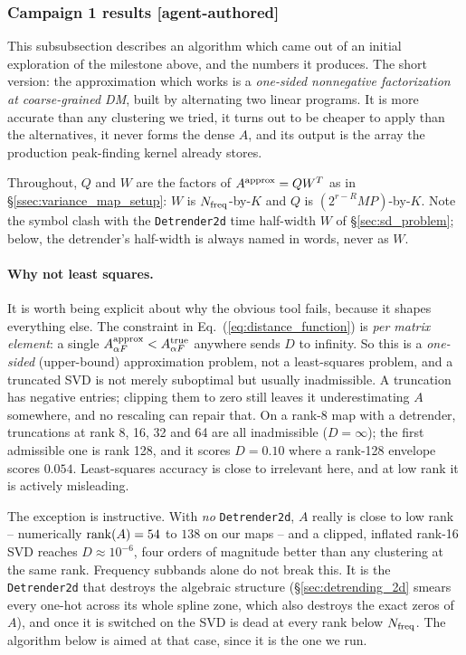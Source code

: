 \documentclass{article}
\numberwithin{equation}{section}   %
\begin{document}
\subsubsection{Campaign 1 results [agent-authored]}
\label{sssec:varmap_proposed}

This subsubsection describes an algorithm which came out of an initial exploration of the
milestone above, and the numbers it produces. The short version: the approximation which works is
a {\em one-sided nonnegative factorization at coarse-grained DM}, built by alternating two
linear programs. It is more accurate than any clustering we tried, it turns out to be cheaper to
apply than the alternatives, it never forms the dense $A$, and its output is the array the
production peak-finding kernel already stores.

Throughout, $Q$ and $W$ are the factors of $A^{\rm approx} = QW^T$ as in
\S\ref{ssec:variance_map_setup}: $W$ is $N_{\rm freq}$-by-$K$ and $Q$ is $(2^{r-R}MP)$-by-$K$.
Note the symbol clash with the {\tt Detrender2d} time half-width $W$ of \S\ref{sec:sd_problem};
below, the detrender's half-width is always named in words, never as $W$.

\paragraph*{Why not least squares.}
It is worth being explicit about why the obvious tool fails, because it shapes everything else.
The constraint in Eq.\ (\ref{eq:distance_function}) is {\em per matrix element}: a single
$A^{\rm approx}_{\alpha F} < A^{\rm true}_{\alpha F}$ anywhere sends $D$ to infinity. So this is
a {\em one-sided} (upper-bound) approximation problem, not a least-squares problem, and a
truncated SVD is not merely suboptimal but usually inadmissible. A truncation has negative
entries; clipping them to zero still leaves it underestimating $A$ somewhere, and no rescaling
can repair that. On a rank-8 map with a detrender, truncations at rank 8, 16, 32 and 64 are all
inadmissible ($D = \infty$); the first admissible one is rank 128, and it scores $D = 0.10$
where a rank-128 envelope scores $0.054$. Least-squares accuracy is close to irrelevant here,
and at low rank it is actively misleading.

The exception is instructive. With {\em no} {\tt Detrender2d}, $A$ really is close to low rank
-- numerically ${\rm rank}(A) = 54$ to $138$ on our maps -- and a clipped, inflated rank-16 SVD
reaches $D \approx 10^{-6}$, four orders of magnitude better than any clustering at the same
rank. Frequency subbands alone do not break this. It is the {\tt Detrender2d} that destroys the
algebraic structure (\S\ref{sec:detrending_2d} smears every one-hot across its whole spline
zone, which also destroys the exact zeros of $A$), and once it is switched on the SVD is dead at
every rank below $N_{\rm freq}$. The algorithm below is aimed at that case, since it is the one
we run.
\end{document}
